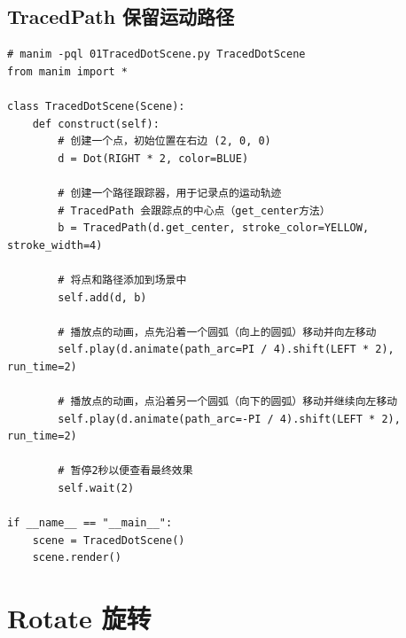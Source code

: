 \subsection{TracedPath 保留运动路径}
\label{subsubsec:manim_animation_move_tracedpath}
\begin{lstlisting}[style=pythonstyle]
# manim -pql 01TracedDotScene.py TracedDotScene
from manim import *

class TracedDotScene(Scene):
    def construct(self):
        # 创建一个点，初始位置在右边 (2, 0, 0)
        d = Dot(RIGHT * 2, color=BLUE)
        
        # 创建一个路径跟踪器，用于记录点的运动轨迹
        # TracedPath 会跟踪点的中心点（get_center方法）
        b = TracedPath(d.get_center, stroke_color=YELLOW, stroke_width=4)
        
        # 将点和路径添加到场景中
        self.add(d, b)

        # 播放点的动画，点先沿着一个圆弧（向上的圆弧）移动并向左移动
        self.play(d.animate(path_arc=PI / 4).shift(LEFT * 2), run_time=2)
        
        # 播放点的动画，点沿着另一个圆弧（向下的圆弧）移动并继续向左移动
        self.play(d.animate(path_arc=-PI / 4).shift(LEFT * 2), run_time=2)

        # 暂停2秒以便查看最终效果
        self.wait(2)

if __name__ == "__main__":
    scene = TracedDotScene()
    scene.render()
\end{lstlisting}

\section{Rotate 旋转}
\label{sec:manim_animation_rotate}

